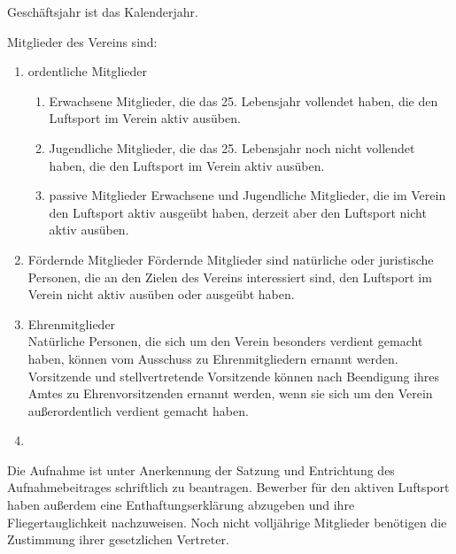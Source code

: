 \documentclass[10pt,a4paper,parskip=half]{scrartcl}
\providecommand{\DIFaddtex}[1]{{\protect\color{blue}\uwave{#1}}} %
\providecommand{\DIFaddbegin}{} %
\providecommand{\DIFaddend}{} %
\providecommand{\DIFadd}[1]{\texorpdfstring{\DIFaddtex{#1}}{#1}} %
\newcommand{\DIFaddincludegraphics}[2][]{{\color{blue}\fbox{\DIFOincludegraphics[#1]{#2}}}} %
\DeclareRobustCommand{\DIFaddbegin}{\DIFOaddbegin \let\includegraphics\DIFaddincludegraphics} %
\DeclareRobustCommand{\DIFaddend}{\DIFOaddend \let\includegraphics\DIFOincludegraphics} %
\begin{document}
\begin{contract}
    Geschäftsjahr ist das Kalenderjahr.

    \label{C:Mitglieder}

    Mitglieder des Vereins sind:
    \begin{enumerate}
      \item ordentliche Mitglieder
            \begin{enumerate}
              \item Erwachsene Mitglieder,
                    die das 25. Lebensjahr vollendet haben,
                    die den Luftsport im Verein aktiv
                    ausüben. \label{S:OrdentlicheMitglieder:Erwachsene}
              \item Jugendliche Mitglieder,
                    die das 25. Lebensjahr noch nicht vollendet haben,
                    die den Luftsport im Verein aktiv ausüben. \label{S:OrdentlicheMitglieder:Jugendliche}
              \item{passive Mitglieder} Erwachsene und Jugendliche Mitglieder,
                    die im Verein den Luftsport aktiv ausgeübt haben,
                    derzeit aber den Luftsport nicht aktiv ausüben.
            \end{enumerate}
      \item{Fördernde Mitglieder} Fördernde Mitglieder sind natürliche oder juristische Personen,
            die an den Zielen des Vereins interessiert sind,
            den Luftsport im Verein nicht aktiv ausüben oder ausgeübt haben.

      \item{Ehrenmitglieder}\\
            Natürliche Personen,
            die sich um den Verein besonders verdient gemacht haben,
            können vom Ausschuss zu Ehrenmitgliedern ernannt werden.
            Vorsitzende und stellvertretende Vorsitzende können nach Beendigung ihres Amtes zu Ehrenvorsitzenden ernannt werden,
            wenn sie sich um den Verein außerordentlich verdient gemacht haben.
      \DIFaddbegin \item \DIFadd{Mitglieder auf Probe}\label{S:MitgliederAufProbe}
    \DIFaddend \end{enumerate}\label{S:OrdentlicheMitglieder}


    Die Aufnahme ist unter Anerkennung der Satzung und Entrichtung des Aufnahmebeitrages schriftlich zu beantragen.
    Bewerber für den aktiven Luftsport haben außerdem eine Enthaftungserklärung abzugeben und ihre Fliegertauglichkeit nachzuweisen.
    Noch nicht volljährige Mitglieder benötigen die Zustimmung ihrer gesetzlichen Vertreter.


\end{contract}
\end{document}
